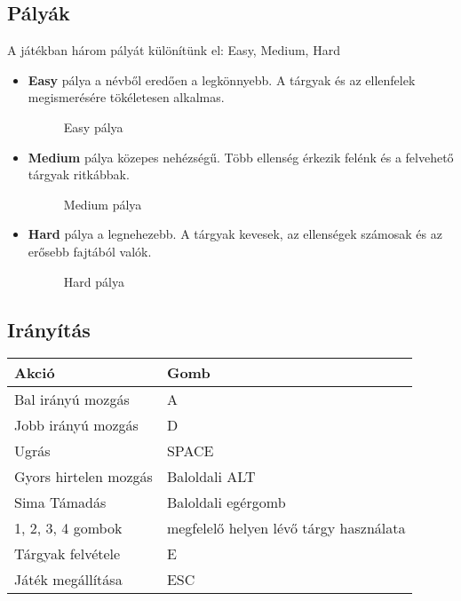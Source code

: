 \begin{enumerate}
\end{enumerate}

\subsection{Pályák}
A játékban három pályát különítünk el: Easy, Medium, Hard

\begin{itemize}
	\item \textbf{Easy} pálya a névből eredően a legkönnyebb. A tárgyak és az ellenfelek megismerésére tökéletesen alkalmas.
	\begin{figure}[H]
		\noindent{}
		\caption{Easy pálya}
	\end{figure}
		\cleardoublepage
		\item \textbf{Medium} pálya közepes nehézségű. Több ellenség érkezik felénk és a felvehető tárgyak ritkábbak.
	\begin{figure}[H]
		\noindent{}
		\caption{Medium pálya}
	\end{figure}
	
		\item \textbf{Hard} pálya a legnehezebb. A tárgyak kevesek, az ellenségek számosak és az erősebb fajtából valók.
	\begin{figure}[H]
		\noindent{}
		\caption{Hard pálya}
	\end{figure}
\end{itemize}

\subsection{Irányítás}
\begin{table}[H]
	\centering
	\begin{tabular}{ | m{} | m{} | }
		\hline
		\textbf{Akció} & \textbf{Gomb} \\
		\hline \hline
		Bal irányú mozgás & A \\ \hline
		Jobb irányú mozgás & D \\ \hline
		Ugrás & SPACE \\ \hline
		Gyors hirtelen mozgás & Baloldali ALT \\ \hline
		Sima Támadás & Baloldali egérgomb \\ \hline
		1, 2, 3, 4 gombok & megfelelő helyen lévő tárgy használata \\ \hline
		Tárgyak felvétele & E \\ \hline
		Játék megállítása & ESC \\ \hline
	\end{tabular}
	\label{instruc}
\end{table}


